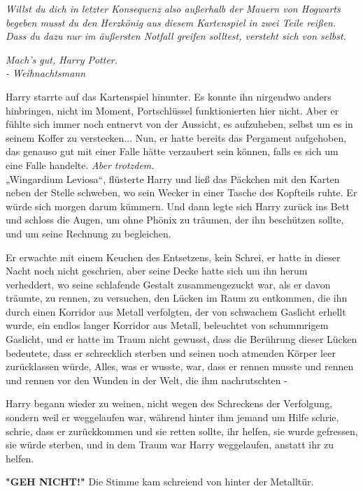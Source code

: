 {\hfill\break

\emph{Willst du dich in letzter Konsequenz also außerhalb der Mauern von Hogwarts begeben musst du den Herzkönig aus diesem Kartenspiel in zwei Teile reißen. Dass du dazu nur im äußersten Notfall greifen solltest, versteht sich von selbst.}

\emph{Mach's gut, Harry Potter.\\ - Weihnachtsmann}

\hfill\break Harry starrte auf das Kartenspiel hinunter. Es konnte ihn nirgendwo anders hinbringen, nicht im Moment, Portschlüssel funktionierten hier nicht. Aber er fühlte sich immer noch entnervt von der Aussicht, es aufzuheben, selbst um es in seinem Koffer zu verstecken... Nun, er hatte bereits das Pergament aufgehoben, das genauso gut mit einer Falle hätte verzaubert sein können, falls es sich um eine Falle handelte. \emph{Aber trotzdem.}\\ „Wingardium Leviosa“, flüsterte Harry und ließ das Päckchen mit den Karten neben der Stelle schweben, wo sein Wecker in einer Tasche des Kopfteils ruhte. Er würde sich morgen darum kümmern. Und dann legte sich Harry zurück ins Bett und schloss die Augen, um ohne Phönix zu träumen, der ihn beschützen sollte, und um seine Rechnung zu begleichen.

Er erwachte mit einem Keuchen des Entsetzens, kein Schrei, er hatte in dieser Nacht noch nicht geschrien, aber seine Decke hatte sich um ihn herum verheddert, wo seine schlafende Gestalt zusammengezuckt war, als er davon träumte, zu rennen, zu versuchen, den Lücken im Raum zu entkommen, die ihn durch einen Korridor aus Metall verfolgten, der von schwachem Gaslicht erhellt wurde, ein endlos langer Korridor aus Metall, beleuchtet von schummrigem Gaslicht, und er hatte im Traum nicht gewusst, dass die Berührung dieser Lücken bedeutete, dass er schrecklich sterben und seinen noch atmenden Körper leer zurücklassen würde, Alles, was er wusste, war, dass er rennen musste und rennen und rennen vor den Wunden in der Welt, die ihm nachrutschten -

Harry begann wieder zu weinen, nicht wegen des Schreckens der Verfolgung, sondern weil er weggelaufen war, während hinter ihm jemand um Hilfe schrie, schrie, dass er zurückkommen und sie retten sollte, ihr helfen, sie wurde gefressen, sie würde sterben, und in dem Traum war Harry weggelaufen, anstatt ihr zu helfen.

\textbf{"GEH NICHT!"} Die Stimme kam schreiend von hinter der Metalltür.

}
